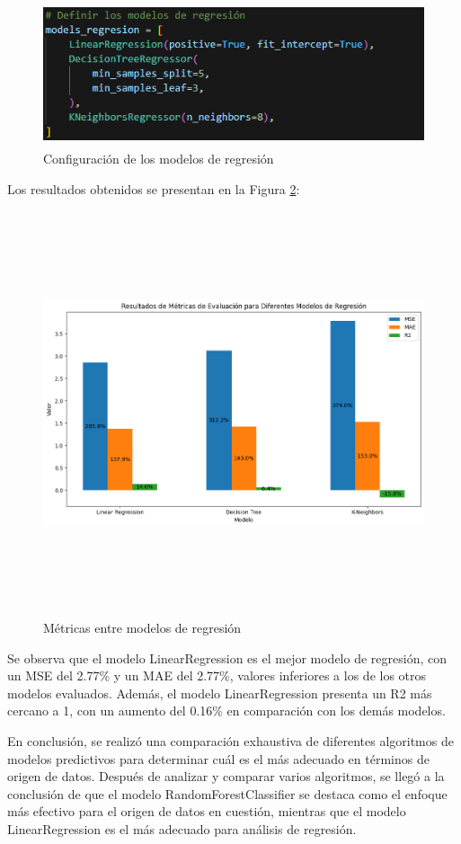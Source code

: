 \begin{figure}[H]
    \centering
    \includegraphics[width=5.06111in,height=1.68611in]{img/compara_algoritmos/configModelsRegresion.png}
    \caption{Configuración de los modelos de regresión}
    \label{fig:config_regresion}
\end{figure}

Los resultados obtenidos se presentan en la Figura \ref{fig:metricas_regresion}:

\begin{figure}[H]
    \centering
    \includegraphics[width=7.06111in,height=4.68611in]{img/compara_algoritmos/metricasEntreModelosRegresion.png}
    \caption{Métricas entre modelos de regresión}
    \label{fig:metricas_regresion}
\end{figure}

Se observa que el modelo LinearRegression es el mejor modelo de regresión, con un MSE del 2.77\% y un MAE del 2.77\%, valores inferiores a los de los otros modelos evaluados. Además, el modelo LinearRegression presenta un R2 más cercano a 1, con un aumento del 0.16\% en comparación con los demás modelos.

En conclusión, se realizó una comparación exhaustiva de diferentes algoritmos de modelos predictivos para determinar cuál es el más adecuado en términos de origen de datos. Después de analizar y comparar varios algoritmos, se llegó a la conclusión de que el modelo RandomForestClassifier se destaca como el enfoque más efectivo para el origen de datos en cuestión, mientras que el modelo LinearRegression es el más adecuado para análisis de regresión.